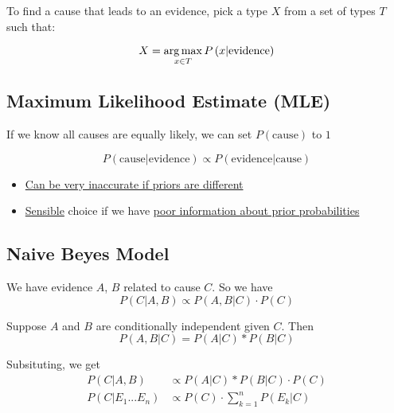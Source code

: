    To find a cause that leads to an evidence, pick a type $ X $ from a set of
    types $ T $ such that:

    \begin{equation}
      X = \operatorname*{arg\,max}_{x \in T} P\left( x | \text{evidence} \right)
    \end{equation}

  \subsection{Maximum Likelihood Estimate (MLE)}

    If we know all causes are equally likely, we can set $ P\left( \text{cause} \right) $
    to $ 1 $

    \begin{equation}
      P\left( \text{cause} | \text{evidence} \right)
        \propto P\left( \text{evidence} | \text{cause} \right)
    \end{equation}

    \begin{itemize}
      \item \ul{Can be very inaccurate if priors are different}
      \item \ul{Sensible} choice if we have \ul{poor information about
      prior probabilities}
    \end{itemize}

  \subsection{Naive Beyes Model}

    We have evidence $ A $, $ B $ related to cause $ C $. So we have
    \begin{displaymath}
      P\left( C | A, B \right) \propto P\left( A, B | C \right) \cdot P\left( C \right)
    \end{displaymath}

    Suppose $ A $ and $ B $ are conditionally independent given $ C $. Then
    \begin{displaymath}
      P\left( A, B | C \right) = P\left( A | C \right) * P\left( B | C \right)
    \end{displaymath}

    Subsituting, we get
    \begin{align}
      P\left( C | A, B \right) &\propto P\left( A | C \right) * P\left( B | C \right) \cdot P\left( C \right) \\
      P\left( C | E_{1} ... E_{n} \right) &\propto P\left( C \right) \cdot \sum_{k = 1}^{n} P\left( E_{k} | C \right)
    \end{align}

